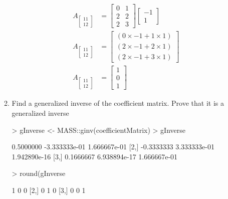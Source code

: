 \documentclass[12pt,a4paper]{paper}
\begin{document}
\begin{enumerate}
\begin{enumerate}
\begin{equation}
\begin{split}
A_{\left[\begin{array}{c}11\\12\end{array}\right]}&= \left[\begin{array}{cc}0&1\\2&2\\2&3\end{array}\right]\left[\begin{array}{c}-1\\1\end{array}\right]\\
A_{\left[\begin{array}{c}11\\12\end{array}\right]}&= \left[\begin{array}{c}(0 \times -1 + 1 \times 1)\\(2 \times -1 + 2 \times 1)\\(2 \times -1 + 3 \times 1)\end{array}\right]\\
A_{\left[\begin{array}{c}11\\12\end{array}\right]}&= \left[\begin{array}{c}1\\0\\1\end{array}\right]
\end{split}
\end{equation}
\item Find a generalized inverse of the coefficient matrix. Prove that it is a generalized inverse
\begin{Schunk}
\begin{Sinput}
> gInverse <- MASS::ginv(coefficientMatrix)
> gInverse
\end{Sinput}
\begin{Soutput}
           [,1]          [,2]         [,3]
[1,]  0.5000000 -3.333333e-01 1.666667e-01
[2,] -0.3333333  3.333333e-01 1.942890e-16
[3,]  0.1666667  6.938894e-17 1.666667e-01
\end{Soutput}
\begin{Sinput}
> round(gInverse %*% coefficientMatrix)
\end{Sinput}
\begin{Soutput}
     [,1] [,2] [,3]
[1,]    1    0    0
[2,]    0    1    0
[3,]    0    0    1
\end{Soutput}
\begin{Sinput}

\end{Sinput}
\end{Schunk}
\end{enumerate}
\end{enumerate}
\end{document}
